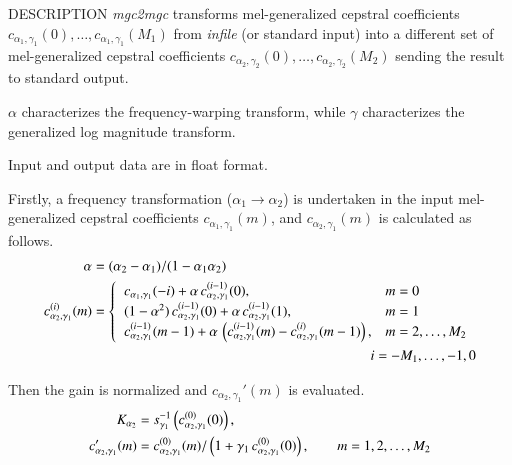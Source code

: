 \begin{synopsis}
 \item [mgc2mgc] [ --m $M_1$ ] [ --a $A_1$ ] [ --g $G_1$ ] [ --c
   $C_1$ ] [ --n ] [ --u ]
 \item [\ ~~~~~~~~~~~] [ --M $M_2$ ] [ --A $A_2$ ] [ --G $G_2$ ]
   [ --C $C_2$ ] [ --N ] [ --U ] [ {\em infile} ] 
\end{synopsis}

\begin{qsection}{DESCRIPTION}
{\em mgc2mgc} transforms mel-generalized cepstral coefficients
$c_{\alpha_1,\gamma_1}(0), \dots, c_{\alpha_1,\gamma_1}(M_1)$
from {\em infile} (or standard input) 
into a different set of mel-generalized cepstral coefficients
$c_{\alpha_2,\gamma_2}(0), \dots, c_{\alpha_2,\gamma_2}(M_2)$
sending the result to standard output.

$\alpha$ characterizes the frequency-warping transform,
while $\gamma$ characterizes the generalized log magnitude transform.

Input and output data are in float format.

Firstly, a frequency transformation ($\alpha_1 \rightarrow \alpha_2$)
is undertaken in the input mel-generalized cepstral
coefficients $c_{\alpha_1,\gamma_1}(m)$,
and $c_{\alpha_2,\gamma_1}(m)$ is calculated as follows.
\begin{align} 
\alpha &= (\alpha_2-\alpha_1)/(1-\alpha_1\alpha_2) \notag \\
c_{\alpha_2,\gamma_1}^{(i)}(m) &= \begin{cases}
          \;\; c_{\alpha_1,\gamma_1}(-i)
            +\alpha\,c_{\alpha_2,\gamma_1}^{(i-1)}(0), &  m=0 \\
          \;\; (1-\alpha^2)\,c_{\alpha_2,\gamma_1}^{(i-1)}(0)
            +\alpha\,c_{\alpha_2,\gamma_1}^{(i-1)}(1), &  m=1 \\
          \;\; c_{\alpha_2,\gamma_1}^{(i-1)}(m-1) 
            +\alpha\, \left(c_{\alpha_2,\gamma_1}^{(i-1)}(m)
            -c_{\alpha_2,\gamma_1}^{(i)}(m-1)\right), &   m=2,\dots,M_2
         \end{cases} \notag \\
&\hspace{70mm} i = -M_1,\dots,-1,0 \notag
\end{align}

Then the gain is normalized and $c_{\alpha_2,\gamma_1}'(m)$ 
is evaluated.
\begin{align}
K_{\alpha_2} &= 
        s_{\gamma_1}^{-1}\left(c_{\alpha_2,\gamma_1}^{(0)}(0)\right), \notag \\ 
c_{\alpha_2,\gamma_1}'(m) &=
          c_{\alpha_2,\gamma_1}^{(0)}(m)/\left(1+\gamma_1\,
          c_{\alpha_2,\gamma_1}^{(0)}(0)\right), \qquad m = 1,2,\dots, M_2 \notag
\end{align}


\end{qsection}
